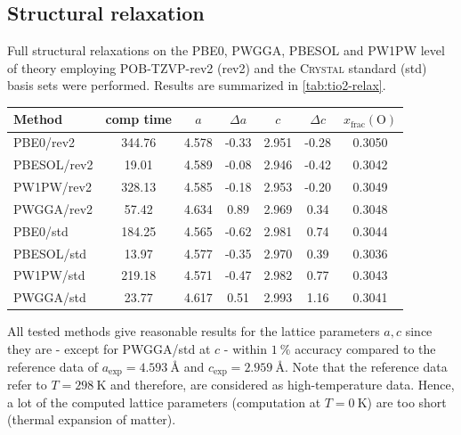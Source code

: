 \documentclass[a4paper,12pt,parskip=half]{scrartcl}
\begin{document}
\subsection{Structural relaxation}
%
Full structural relaxations on the PBE0, PWGGA, PBESOL\autocite[]{pbesol} and PW1PW level of theory employing POB-TZVP-rev2 (rev2) and the \textsc{Crystal} standard (std) basis sets were performed. Results are summarized in \autoref{tab:tio2-relax}.
%
\begin{table}[H]
	\centering
	\label{tab:tio2-relax}
	\begin{tabular}{lcccccc}
		\toprule
		Method      & comp time & $a$   & $\Delta a $ & $c$   & $\Delta c$ & $x_\mathrm{frac} \mathrm{(O)}$ \\
		\midrule
		PBE0/rev2   & 344.76    & 4.578 & -0.33       & 2.951 & -0.28      & 0.3050                          \\
		PBESOL/rev2 & 19.01     & 4.589 & -0.08       & 2.946 & -0.42      & 0.3042                          \\
		PW1PW/rev2  & 328.13    & 4.585 & -0.18       & 2.953 & -0.20       & 0.3049                          \\
		PWGGA/rev2  & 57.42     & 4.634 & 0.89        & 2.969 & 0.34       & 0.3048                          \\
		PBE0/std    & 184.25    & 4.565 & -0.62       & 2.981 & 0.74       & 0.3044                          \\
		PBESOL/std  & 13.97     & 4.577 & -0.35       & 2.970 & 0.39       & 0.3036                          \\
		PW1PW/std   & 219.18    & 4.571 & -0.47       & 2.982 & 0.77       & 0.3043                          \\
		PWGGA/std   & 23.77     & 4.617 & 0.51        & 2.993 & 1.16       & 0.3041                          \\
		\bottomrule
	\end{tabular}
\end{table}
%
All tested methods give reasonable results for the lattice parameters $ a, c $ since they are - except for PWGGA/std at $ c $ - within $ \SI{1}{\percent} $ accuracy compared to the reference data of $ a_\mathrm{exp} = \SI{4.593}{\angstrom} $ and $ c_\mathrm{exp} = \SI{2.959}{\angstrom} $. Note that the reference data refer to $ T = \SI{298}{\kelvin} $ and therefore, are considered as high-temperature data. Hence, a lot of the computed lattice parameters (computation at $ T = \SI{0}{\kelvin} $) are too short (thermal expansion of matter).
\end{document}
